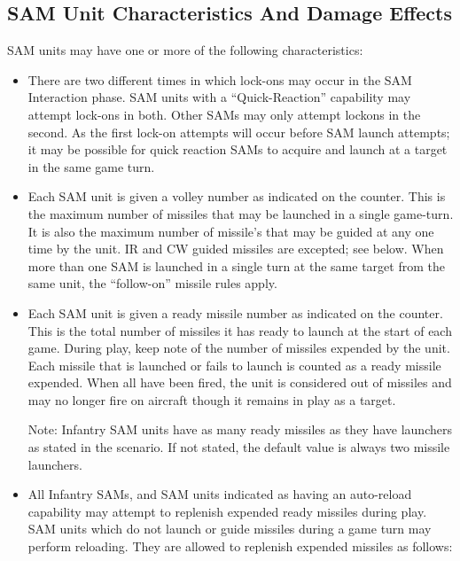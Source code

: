 

\subsection{SAM Unit Characteristics And Damage Effects} SAM units may have one or more of the following characteristics:

\begin{itemize}
    \item{} There are two different times in which lock-ons may occur in the SAM Interaction phase. SAM units with a “Quick-Reaction” capability may attempt lock-ons in both. Other SAMs may only attempt lock­ons in the second. As the first lock-on attempts will occur before SAM launch attempts; it may be possible for quick reaction SAMs to acquire and launch at a target in the same game turn.


    \item{} Each SAM unit is given a volley number as indicated on the counter. This is the maximum number of missiles that may be launched in a single game-turn. It is also the maximum number of missile's that may be guided at any one time by the unit. IR and CW guided missiles are excepted; see below. When more than one SAM is launched in a single turn at the same target from the same unit, the “follow-on” missile rules apply.

    \item{} Each SAM unit is given a ready missile number as indicated on the counter. This is the total number of missiles it has ready to launch at the start of each game. During play, keep note of the number of missiles expended by the unit. Each missile that is launched or fails to launch is counted as a ready missile expended. When all have been fired, the unit is considered out of missiles and may no longer fire on aircraft though it remains in play as a target.

        Note: Infantry SAM units have as many ready missiles as they have launchers as stated in the scenario. If not stated, the default value is always two missile launchers.

    \item{} All Infantry SAMs, and SAM units indicated as having an auto-reload capability may attempt to replenish expended ready missiles during play. SAM units which do not launch or guide missiles during a game turn may perform reloading. They are allowed to replenish expended missiles as follows:


\end{itemize}
